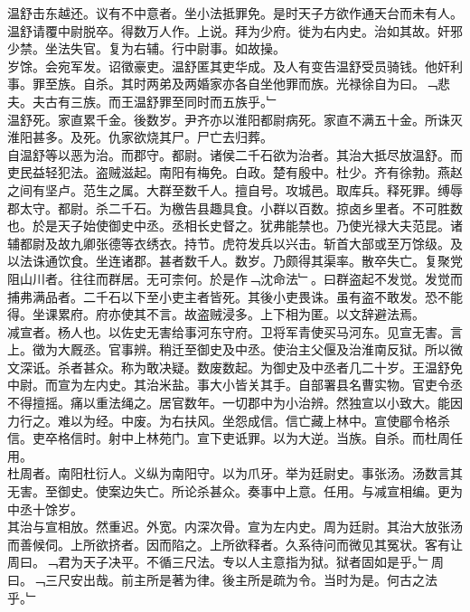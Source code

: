\documentclass{zhvt-classic}
\begin{document}
\hspace*{2em}温舒击东越还。议有不中意者。坐小法抵罪免。是时天子方欲作通天台而未有人。温舒请覆中尉脱卒。得数万人作。上说。拜为少府。徙为右内史。治如其故。奸邪少禁。坐法失官。复为右辅。行中尉事。如故操。\\
\hspace*{2em}岁馀。会宛军发。诏徵豪吏。温舒匿其吏华成。及人有变告温舒受员骑钱。他奸利事。罪至族。自杀。其时两弟及两婚家亦各自坐他罪而族。光禄徐自为曰。﹁悲夫。夫古有三族。而王温舒罪至同时而五族乎。﹂\\
\hspace*{2em}温舒死。家直累千金。後数岁。尹齐亦以淮阳都尉病死。家直不满五十金。所诛灭淮阳甚多。及死。仇家欲烧其尸。尸亡去归葬。\\
\hspace*{2em}自温舒等以恶为治。而郡守。都尉。诸侯二千石欲为治者。其治大抵尽放温舒。而吏民益轻犯法。盗贼滋起。南阳有梅免。白政。楚有殷中。杜少。齐有徐勃。燕赵之间有坚卢。范生之属。大群至数千人。擅自号。攻城邑。取库兵。释死罪。缚辱郡太守。都尉。杀二千石。为檄告县趣具食。小群以百数。掠卤乡里者。不可胜数也。於是天子始使御史中丞。丞相长史督之。犹弗能禁也。乃使光禄大夫范昆。诸辅都尉及故九卿张德等衣绣衣。持节。虎符发兵以兴击。斩首大部或至万馀级。及以法诛通饮食。坐连诸郡。甚者数千人。数岁。乃颇得其渠率。散卒失亡。复聚党阻山川者。往往而群居。无可柰何。於是作﹁沈命法﹂。曰群盗起不发觉。发觉而捕弗满品者。二千石以下至小吏主者皆死。其後小吏畏诛。虽有盗不敢发。恐不能得。坐课累府。府亦使其不言。故盗贼浸多。上下相为匿。以文辞避法焉。\\
\hspace*{2em}减宣者。杨人也。以佐史无害给事河东守府。卫将军青使买马河东。见宣无害。言上。徵为大厩丞。官事辨。稍迁至御史及中丞。使治主父偃及治淮南反狱。所以微文深诋。杀者甚众。称为敢决疑。数废数起。为御史及中丞者几二十岁。王温舒免中尉。而宣为左内史。其治米盐。事大小皆关其手。自部署县名曹实物。官吏令丞不得擅摇。痛以重法绳之。居官数年。一切郡中为小治辨。然独宣以小致大。能因力行之。难以为经。中废。为右扶风。坐怨成信。信亡藏上林中。宣使郿令格杀信。吏卒格信时。射中上林苑门。宣下吏诋罪。以为大逆。当族。自杀。而杜周任用。\\
\hspace*{2em}杜周者。南阳杜衍人。义纵为南阳守。以为爪牙。举为廷尉史。事张汤。汤数言其无害。至御史。使案边失亡。所论杀甚众。奏事中上意。任用。与减宣相编。更为中丞十馀岁。\\
\hspace*{2em}其治与宣相放。然重迟。外宽。内深次骨。宣为左内史。周为廷尉。其治大放张汤而善候伺。上所欲挤者。因而陷之。上所欲释者。久系待问而微见其冤状。客有让周曰。﹁君为天子决平。不循三尺法。专以人主意指为狱。狱者固如是乎。﹂周曰。﹁三尺安出哉。前主所是著为律。後主所是疏为令。当时为是。何古之法乎。﹂\\
\end{document}
